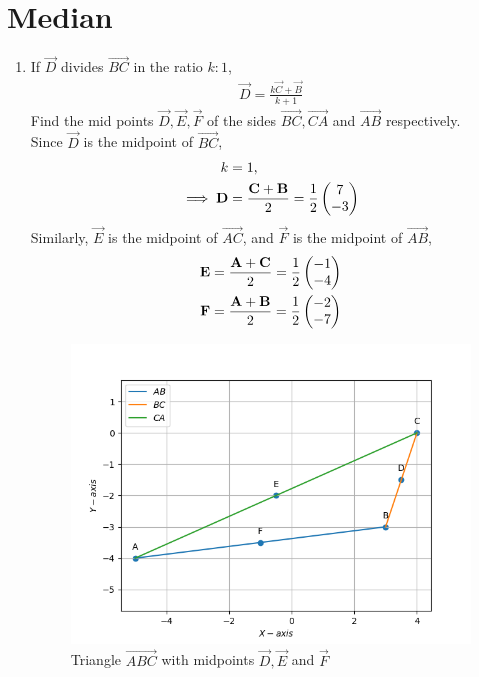\documentclass[10pt]{book}
\begin{document}
\section{Median}
\begin{enumerate}[label=\thesection.\arabic*.,ref=\thesection.\theenumi]
\item If $\vec{D}$ divides $\vec{BC}$ in the ratio $k\colon1$,
    \begin{align}
	\vec{D}= \frac{k\vec{C}+\vec{B}}{k+1}
    \end{align}
    Find the mid points $\vec{D}, \vec{E}, \vec{F}$ of the sides $\vec{BC}, \vec{CA}$ and $\vec{AB}$ respectively.\
\solution \\
Since $\vec{D}$ is the midpoint of $\vec{BC}$,
\begin{align}
k &= 1,\\
\implies \vec{D} &= \frac{\vec{C} + \vec{B}}{2}
= \frac{1}{2}\myvec{7\\-3}
	\label{eq:median-d}
\end{align}
Similarly, $\vec{E}$ is the midpoint of $\vec{AC}$, and $\vec{F}$ is the midpoint of $\vec{AB}$,
\begin{align}
	\label{eq:median-e}
\vec{E} &= \frac{\vec{A} + \vec{C}}{2}
= \frac{1}{2}\myvec{-1\\-4}\\
\vec{F} &= \frac{\vec{A} + \vec{B}}{2}
= \frac{1}{2}\myvec{-2\\-7}
	\label{eq:median-f}
\end{align}
\begin{figure}[H]
\centering
\includegraphics[width=\columnwidth]{figs/DEF_midpoints.png}
\caption{Triangle $\vec{ABC}$ with midpoints $\vec{D},\vec{E}$ and $\vec{F}$}
\label{fig:DEF_midpoints}
\end{figure}


\end{enumerate}
\end{document}
